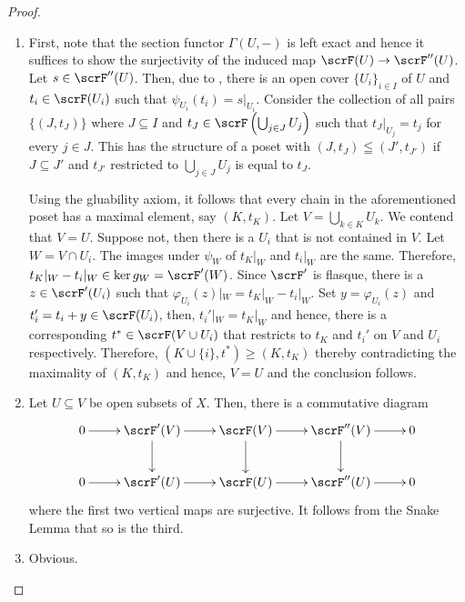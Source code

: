 \begin{proof}
\begin{enumerate}[label=(\alph*)]
    \item First, note that the section functor $\Gamma(U, -)$ is left exact and hence it suffices to show the surjectivity of the induced map $\scrF(U)\to\scrF''(U)$. Let $s\in\scrF''(U)$. Then, due to , there is an open cover $\{U_i\}_{i\in I}$ of $U$ and $t_i\in\scrF(U_i)$ such that $\psi_{U_i}(t_i) = s|_{U_i}$. Consider the collection of all pairs $\{(J, t_J)\}$ where $J\subseteq I$ and $t_J\in\scrF\left(\bigcup_{j\in J}U_j\right)$ such that $t_J|_{U_j} = t_j$ for every $j\in J$. This has the structure of a poset with $(J, t_J)\leqq(J', t_{J'})$ if $J\subseteq J'$ and $t_{J'}$ restricted to $\bigcup_{j\in J}U_j$ is equal to $t_J$.

    Using the gluability axiom, it follows that every chain in the aforementioned poset has a maximal element, say $(K, t_K)$. Let $V = \bigcup_{k\in K} U_k$. We contend that $V = U$. Suppose not, then there is a $U_i$ that is not contained in $V$. Let $W = V\cap U_i$. The images under $\psi_{W}$ of $t_K|_{W}$ and $t_i|_W$ are the same. Therefore, $t_K|_W - t_i|_W\in\ker g_W = \scrF'(W)$. Since $\scrF'$ is flasque, there is a $z\in\scrF'(U_i)$ such that $\varphi_{U_i}(z)|_W = t_K|_W - t_i|_W$. Set $y = \varphi_{U_i}(z)$ and $t_i' = t_i + y\in\scrF(U_i)$, then, $t_i'|_W = t_K|_W$ and hence, there is a corresponding $t^\ast\in\scrF(V\cup U_i)$ that restricts to $t_K$ and $t_i'$ on $V$ and $U_i$ respectively. Therefore, $(K\cup\{i\}, t^\ast)\ge(K, t_K)$ thereby contradicting the maximality of $(K, t_K)$ and hence, $V = U$ and the conclusion follows.

    \item Let $U\subseteq V$ be open subsets of $X$. Then, there is a commutative diagram 
    \begin{equation*}
        \xymatrix{
            0\ar[r] & \scrF'(V)\ar[r]\ar[d] & \scrF(V)\ar[r]\ar[d] & \scrF''(V)\ar[r]\ar[d] & 0\\
            0\ar[r] & \scrF'(U)\ar[r] & \scrF(U)\ar[r] & \scrF''(U)\ar[r] & 0
        }
    \end{equation*}
    where the first two vertical maps are surjective. It follows from the Snake Lemma that so is the third.

    \item Obvious.\qedhere
\end{enumerate}
\end{proof}
